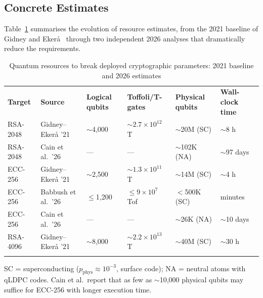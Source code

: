 \subsection{Concrete Estimates}
\label{subsec:concrete-estimates}

Table~\ref{tab:resource-estimates} summarises the evolution of resource estimates, from the 2021 baseline of Gidney and Eker\aa{}~\cite{GidneyEkera2021} through two independent 2026 analyses that dramatically reduce the requirements.

\begin{table}[t]
\caption{Quantum resources to break deployed cryptographic parameters: 2021 baseline and 2026 estimates}
\label{tab:resource-estimates}
\begin{tabular}{p{2cm}p{2.8cm}p{1.8cm}p{1.8cm}p{2.2cm}p{2cm}}
\hline\noalign{\smallskip}
\textbf{Target} & \textbf{Source} & \textbf{Logical qubits} & \textbf{Toffoli/T-gates} & \textbf{Physical qubits} & \textbf{Wall-clock time} \\
\noalign{\smallskip}\svhline\noalign{\smallskip}
RSA-2048  & Gidney--Eker\aa{} '21~\cite{GidneyEkera2021}  & $\sim$4{,}000  & $\sim 2.7 \times 10^{12}$ T & $\sim$20M (SC) & $\sim$8 h \\
RSA-2048  & Cain et al.\ '26~\cite{CainXuKing2026}        & ---            & ---                        & $\sim$102K (NA) & $\sim$97 days \\
ECC-256   & Gidney--Eker\aa{} '21~\cite{GidneyEkera2021}  & $\sim$2{,}500  & $\sim 1.3 \times 10^{11}$ T & $\sim$14M (SC) & $\sim$4 h \\
ECC-256   & Babbush et al.\ '26~\cite{BabbushZalcmanGidney2026} & $\leq$1{,}200 & $\leq 9 \times 10^{7}$ Tof & $<$500K (SC) & minutes \\
ECC-256   & Cain et al.\ '26~\cite{CainXuKing2026}        & ---            & ---                        & $\sim$26K (NA) & $\sim$10 days \\
RSA-4096  & Gidney--Eker\aa{} '21~\cite{GidneyEkera2021}  & $\sim$8{,}000  & $\sim 2.2 \times 10^{13}$ T & $\sim$40M (SC) & $\sim$30 h \\
\noalign{\smallskip}\hline
\end{tabular}
\begin{flushleft}
\small SC = superconducting ($p_\text{phys} \approx 10^{-3}$, surface code); NA = neutral atoms with qLDPC codes.  Cain et al.\ report that as few as $\sim$10{,}000 physical qubits may suffice for ECC-256 with longer execution time.
\end{flushleft}
\end{table}

